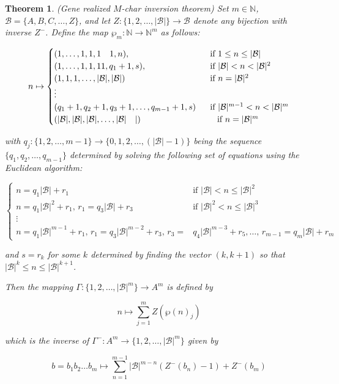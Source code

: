 \documentclass[amsmath,12pt,a4paper]{amsart}
\newtheorem{theorem}{Theorem}
\begin{document}
\begin{theorem}(Gene realized $M$-char inversion theorem)
Set \(m \in \mathbb{N}\), \(\mathcal{B} = \{A, B, C, \ldots, Z\}\), and let \(Z : \{1, 2, \ldots, |\mathcal{B}|\} \to \mathcal{B}\) denote any bijection with inverse \(Z^{-}\). Define the map \(\wp_m : \mathbb{N} \to \mathbb{N}^m\) as follows:

\begin{equation}
n \mapsto
\begin{cases}
(1, \ldots, 1, 1, 1 \quad 1, n), & ~~ \text{if $1 \leq n \leq |\mathcal{B}|$} \\
(1, \ldots, 1, 1, 1 1, q_1 + 1, s), & ~~\text{if $|\mathcal{B}| < n < |\mathcal{B}|^2$} \\
(1, 1, 1, \ldots, |\mathcal{B}|, |\mathcal{B}|) &~~ \text{if $n = |\mathcal{B}|^2$} \\
\vdots \\
(q_1 + 1, q_2 + 1, q_3 + 1, \ldots, q_{m-1} + 1, s) &~~\text{if $|\mathcal{B}|^{m-1} < n < |\mathcal{B}|^m$} \\
(|\mathcal{B}|, |\mathcal{B}|, |\mathcal{B}|, \ldots, |\mathcal{B}| \quad |) & \indent \text{if $n = |\mathcal{B}|^m$}
\end{cases}
\end{equation}

with \(q_j : \{1, 2, \ldots, m - 1\} \to \{0, 1, 2, \ldots, (|\mathcal{B}| - 1)\}\) being the sequence \(\{q_1, q_2, \ldots, q_{m-1}\}\) determined by solving the following set of equations using the Euclidean algorithm:

$$
\begin{cases}
n = q_1|\mathcal{B}| + r_1 & \text{if $|\mathcal{B}| < n \leq |\mathcal{B}|^2$} \\
n = q_1|\mathcal{B}|^2 + r_1, \, r_1 = q_3|\mathcal{B}| + r_3 & \text{if $|\mathcal{B}|^2 < n \leq |\mathcal{B}|^3$} \\
\vdots \\
n = q_1|\mathcal{B}|^{m-1} + r_1, \, r_1 = q_3|\mathcal{B}|^{m-2} + r_3, \, r_3 = & q_4|\mathcal{B}|^{m-3} + r_5,  \ldots, \, r_{m-1} = q_m|\mathcal{B}| + r_m 
\end{cases}
$$

and $s = r_k$ for some $k$ determined by finding the vector $(k, k + 1)$ so that $|\mathcal{B}|^k \leq n \leq |\mathcal{B}|^{k+1}$.

Then the mapping $\Gamma : \{1, 2, \ldots, |\mathcal{B}|^m\} \to A^m$ is defined by

$$
n \mapsto \sum_{j=1}^m Z(\wp(n)_j)
$$

which is the inverse of $\Gamma^{-} : A^m \to \{1, 2, \ldots, |\mathcal{B}|^m\}$ given by

$$
b = b_1 b_2 \ldots b_m \mapsto \sum_{n=1}^{m-1} |\mathcal{B}|^{m-n} \left( Z^{-}(b_n) - 1 \right) + Z^{-}(b_m)
$$
\end{theorem}
\end{document}
